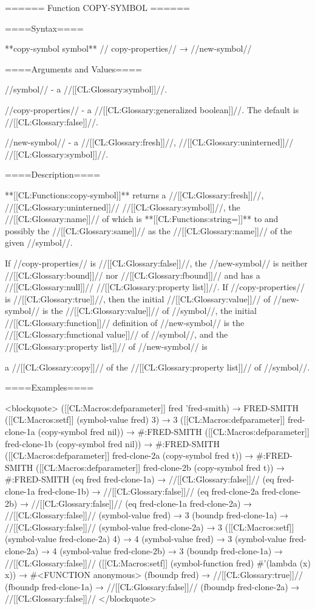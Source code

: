 ====== Function COPY-SYMBOL ======

====Syntax====

**copy-symbol {symbol** //\opt} copy-properties// → //new-symbol//

====Arguments and Values====

//symbol// - a //[[CL:Glossary:symbol]]//.

//copy-properties// - a //[[CL:Glossary:generalized boolean]]//. The default is //[[CL:Glossary:false]]//.

//new-symbol// - a //[[CL:Glossary:fresh]]//, //[[CL:Glossary:uninterned]]// //[[CL:Glossary:symbol]]//.

====Description====

**[[CL:Functions:copy-symbol]]** returns a //[[CL:Glossary:fresh]]//, //[[CL:Glossary:uninterned]]// //[[CL:Glossary:symbol]]//, the //[[CL:Glossary:name]]// of which is **[[CL:Functions:string=]]** to and possibly the //[[CL:Glossary:same]]// as the //[[CL:Glossary:name]]// of the given //symbol//.

If //copy-properties// is //[[CL:Glossary:false]]//, the //new-symbol// is neither //[[CL:Glossary:bound]]// nor //[[CL:Glossary:fbound]]// and has a //[[CL:Glossary:null]]// //[[CL:Glossary:property list]]//. If //copy-properties// is //[[CL:Glossary:true]]//, then the initial //[[CL:Glossary:value]]// of //new-symbol// is the //[[CL:Glossary:value]]// of //symbol//, the initial //[[CL:Glossary:function]]// definition of //new-symbol// is the //[[CL:Glossary:functional value]]// of //symbol//, and the //[[CL:Glossary:property list]]// of //new-symbol// is

a //[[CL:Glossary:copy]]// of the //[[CL:Glossary:property list]]// of //symbol//.

====Examples====

<blockquote> ([[CL:Macros:defparameter]] fred 'fred-smith) → FRED-SMITH ([[CL:Macros:setf]] (symbol-value fred) 3) → 3 ([[CL:Macros:defparameter]] fred-clone-1a (copy-symbol fred nil)) → #:FRED-SMITH ([[CL:Macros:defparameter]] fred-clone-1b (copy-symbol fred nil)) → #:FRED-SMITH ([[CL:Macros:defparameter]] fred-clone-2a (copy-symbol fred t)) → #:FRED-SMITH ([[CL:Macros:defparameter]] fred-clone-2b (copy-symbol fred t)) → #:FRED-SMITH (eq fred fred-clone-1a) → //[[CL:Glossary:false]]// (eq fred-clone-1a fred-clone-1b) → //[[CL:Glossary:false]]// (eq fred-clone-2a fred-clone-2b) → //[[CL:Glossary:false]]// (eq fred-clone-1a fred-clone-2a) → //[[CL:Glossary:false]]// (symbol-value fred) → 3 (boundp fred-clone-1a) → //[[CL:Glossary:false]]// (symbol-value fred-clone-2a) → 3 ([[CL:Macros:setf]] (symbol-value fred-clone-2a) 4) → 4 (symbol-value fred) → 3 (symbol-value fred-clone-2a) → 4 (symbol-value fred-clone-2b) → 3 (boundp fred-clone-1a) → //[[CL:Glossary:false]]// ([[CL:Macros:setf]] (symbol-function fred) #'(lambda (x) x)) → #<FUNCTION anonymous> (fboundp fred) → //[[CL:Glossary:true]]// (fboundp fred-clone-1a) → //[[CL:Glossary:false]]// (fboundp fred-clone-2a) → //[[CL:Glossary:false]]// </blockquote>

